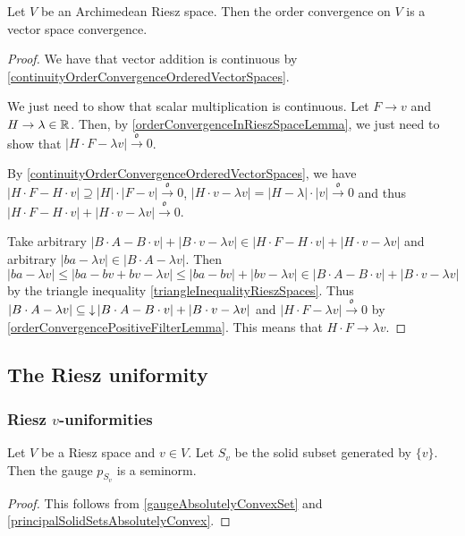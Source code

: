 \begin{proposition}
Let $V$ be an Archimedean Riesz space. Then the order convergence on $V$ is a vector space convergence.
\end{proposition}
\begin{proof}
We have that vector addition is continuous by \ref{continuityOrderConvergenceOrderedVectorSpaces}.

We just need to show that scalar multiplication is continuous. Let $F\to v$ and $H \to \lambda\in \mathbb{R}$. Then, by \ref{orderConvergenceInRieszSpaceLemma}, we just need to show that $|H\cdot F - \lambda v|\overset{\mathfrak{o}}{\longrightarrow} 0$.

By \ref{continuityOrderConvergenceOrderedVectorSpaces}, we have $|H\cdot F - H\cdot v| \supseteq |H|\cdot |F-v| \overset{\mathfrak{o}}{\longrightarrow} 0$, $|H\cdot v - \lambda v| = |H-\lambda|\cdot |v| \overset{\mathfrak{o}}{\longrightarrow} 0$ and thus $|H\cdot F - H\cdot v| + |H\cdot v - \lambda v| \overset{\mathfrak{o}}{\longrightarrow} 0$.

Take arbitrary $|B\cdot A - B\cdot v| + |B\cdot v - \lambda v| \in |H\cdot F - H\cdot v| + |H\cdot v - \lambda v|$ and arbitrary $|ba - \lambda v| \in |B\cdot A - \lambda v|$. Then
\[ |ba - \lambda v| \leq |ba - bv + bv - \lambda v| \leq |ba - bv| + |bv - \lambda v| \in |B\cdot A - B\cdot v| + |B\cdot v - \lambda v| \]
by the triangle inequality \ref{triangleInequalityRieszSpaces}. Thus $|B\cdot A - \lambda v| \subseteq \operatorname{\downarrow} |B\cdot A - B\cdot v| + |B\cdot v - \lambda v|$ and $|H\cdot F - \lambda v| \overset{\mathfrak{o}}{\longrightarrow} 0$ by \ref{orderConvergencePositiveFilterLemma}. This means that $H\cdot F \to \lambda v$.
\end{proof}

\subsection{The Riesz uniformity}
\subsubsection{Riesz $v$-uniformities}
\begin{lemma}
Let $V$ be a Riesz space and $v\in V$. Let $S_v$ be the solid subset generated by $\{v\}$. Then the gauge $p_{S_v}$ is a seminorm.
\end{lemma}
\begin{proof}
This follows from \ref{gaugeAbsolutelyConvexSet} and \ref{principalSolidSetsAbsolutelyConvex}.
\end{proof}

